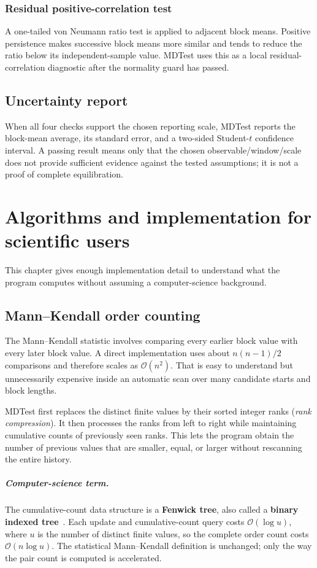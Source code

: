 \documentclass[11pt,oneside]{report}
\begin{document}
\subsection{Residual positive-correlation test}
A one-tailed von Neumann ratio test is applied to adjacent block means. Positive persistence makes successive block means more similar and tends to reduce the ratio below its independent-sample value. MDTest uses this as a local residual-correlation diagnostic after the normality guard has passed.

\section{Uncertainty report}
When all four checks support the chosen reporting scale, MDTest reports the block-mean average, its standard error, and a two-sided Student-$t$ confidence interval. A passing result means only that the chosen observable/window/scale does not provide sufficient evidence against the tested assumptions; it is not a proof of complete equilibration.

\chapter{Algorithms and implementation for scientific users}
This chapter gives enough implementation detail to understand what the program computes without assuming a computer-science background.

\section{Mann--Kendall order counting}
The Mann--Kendall statistic involves comparing every earlier block value with every later block value. A direct implementation uses about $n(n-1)/2$ comparisons and therefore scales as $\mathcal{O}(n^2)$. That is easy to understand but unnecessarily expensive inside an automatic scan over many candidate starts and block lengths.

MDTest first replaces the distinct finite values by their sorted integer ranks (\emph{rank compression}). It then processes the ranks from left to right while maintaining cumulative counts of previously seen ranks. This lets the program obtain the number of previous values that are smaller, equal, or larger without rescanning the entire history.

\paragraph{Computer-science term.} The cumulative-count data structure is a \textbf{Fenwick tree}, also called a \textbf{binary indexed tree}~\cite{Fenwick1994}. Each update and cumulative-count query costs $\mathcal{O}(\log u)$, where $u$ is the number of distinct finite values, so the complete order count costs $\mathcal{O}(n\log u)$. The statistical Mann--Kendall definition is unchanged; only the way the pair count is computed is accelerated.
\end{document}
